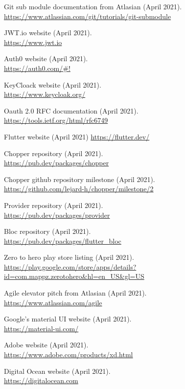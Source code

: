 \documentclass{article}
\begin{document}
\begin{multicols}{2}
\begin{thebibliography}{9}
  Git sub module documentation from Atlasian (April 2021).\\
  \url{https://www.atlassian.com/git/tutorials/git-submodule}
 
  JWT.io website (April 2021).\\
  \url{https://www.jwt.io}

  Auth0 website (April 2021).\\
  \url{https://auth0.com/#!}

  KeyCloack website (April 2021).\\
  \url{https://www.keycloak.org/}

  Oauth 2.0 RFC documentation (April 2021).\\
  \url{https://tools.ietf.org/html/rfc6749}

  Flutter website (April 2021)
  \url{https://flutter.dev/}

  Chopper repository (April 2021).\\
  \url{https://pub.dev/packages/chopper}

  Chopper github repository milestone (April 2021).\\
  \url{https://github.com/lejard-h/chopper/milestone/2}

  Provider repository (April 2021).\\
  \url{https://pub.dev/packages/provider}

  Bloc repository (April 2021).\\
  \url{https://pub.dev/packages/flutter\_bloc}

  Zero to hero play store listing (April 2021).\\
  \url{https://play.google.com/store/apps/details?id=com.mappz.zerotohero&hl=en_US&gl=US}

  Agile elevator pitch from Atlasian (April 2021).\\
  \url{https://www.atlassian.com/agile}

  Google's material UI website (April 2021).\\
  \url{https://material-ui.com/}
  
  Adobe website (April 2021).\\
  \url{https://www.adobe.com/products/xd.html}

  Digital Ocean website (April 2021).\\
  \url{https://digitalocean.com}
\end{thebibliography}


\newpage
\end{multicols}
\end{document}
